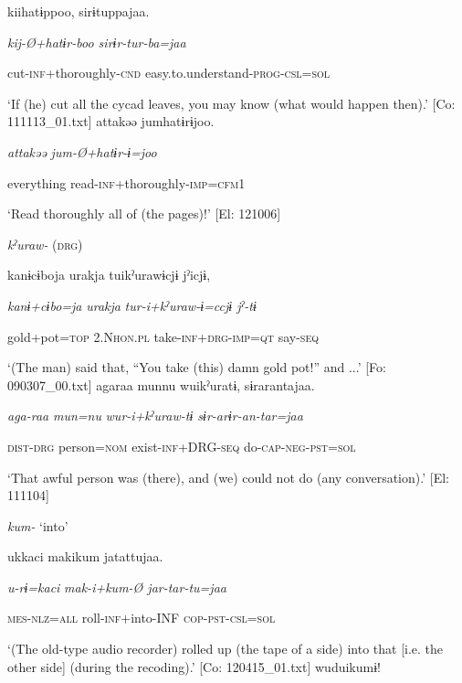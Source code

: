    {\TM}
\glll  kiihatɨppoo,  sirɨtuppajaa.

      \textit{kij-Ø+hatɨr{}-boo  sirɨr-tur-ba=jaa}

      cut-\textsc{inf}+thoroughly-\textsc{cnd}  easy.to.understand-\textsc{prog}-\textsc{csl}=\textsc{sol}

\glt ‘If (he) cut all the cycad leaves, you may know (what would happen then).’ [Co: 111113\_01.txt]
\ex {\TM}
\glll  attakəə  jumhatɨrɨjoo.

      \textit{attakəə}  \textit{jum-Ø+hatɨr{}-ɨ=joo}

      everything  read-\textsc{inf}+thoroughly-\textsc{imp}=\textsc{cfm1}

\glt ‘Read thoroughly all of (the pages)!’ [El: 121006]

  \textit{kˀuraw-} (\textsc{drg})

\ex {\TM}
\glll  kanɨcɨboja  urakja  tuikˀurawɨcjɨ  jˀicjɨ,

      \textit{kanɨ+cɨbo=ja}  \textit{urakja}  \textit{tur-i+kˀuraw{}-ɨ=ccjɨ  jˀ-tɨ}

      gold+pot=\textsc{top}  2.N\textsc{hon}.\textsc{pl}  take-\textsc{inf}+\textsc{drg}-\textsc{imp}=\textsc{qt}  say-\textsc{seq}

\glt ‘(The man) said that, “You take (this) damn gold pot!” and ...’ [Fo: 090307\_00.txt]
\ex {\TM}
\glll  agaraa  munnu  wuikˀuratɨ,  sɨrarantajaa.

      \textit{aga-raa}  \textit{mun=nu}  \textit{wur-i+kˀuraw{}-tɨ  sɨr-arɨr-an-tar=jaa}

      \textsc{dist}-\textsc{drg}  person=\textsc{nom}  exist-\textsc{inf}+DRG-\textsc{seq}  do-\textsc{cap}-\textsc{neg}-\textsc{pst}=\textsc{sol}

\glt ‘That awful person was (there), and (we) could not do (any conversation).’ [El: 111104]

  \textit{kum-} ‘into’

\ex [= (\ref{ex:8-113}c)]

    {\TM}
\glll  ukkaci  makikum  jatattujaa.

      \textit{u-rɨ=kaci}  \textit{mak-i+kum{}-Ø  jar-tar-tu=jaa}

      \textsc{mes}-\textsc{nlz}=\textsc{all}  roll-\textsc{inf}+into-INF  \textsc{cop}-\textsc{pst}-\textsc{csl}=\textsc{sol}

\glt ‘(The old-type audio recorder) rolled up (the tape of a side) into that [i.e. the other side] (during the recoding).’ [Co: 120415\_01.txt]
\ex {\TM}
\glll  wuduikumɨ!

